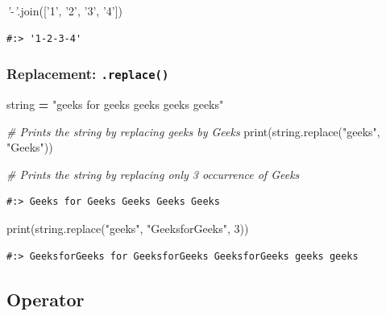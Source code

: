 \documentclass[
]{book}
\newenvironment{Shaded}{\begin{snugshade}}{\end{snugshade}}
\newcommand{\BuiltInTok}[1]{#1}
\newcommand{\CommentTok}[1]{\textcolor[rgb]{0.37,0.37,0.37}{\textit{#1}}}
\newcommand{\DecValTok}[1]{\textcolor[rgb]{0.06,0.06,0.06}{#1}}
\newcommand{\NormalTok}[1]{#1}
\newcommand{\OperatorTok}[1]{\textcolor[rgb]{0.43,0.43,0.43}{\textbf{#1}}}
\newcommand{\StringTok}[1]{\textcolor[rgb]{0.5,0.5,0.5}{#1}}
\begin{document}
\begin{Shaded}
\begin{Highlighting}[]
\CommentTok{'-'}\NormalTok{.join([}\StringTok{'1'}\NormalTok{, }\StringTok{'2'}\NormalTok{, }\StringTok{'3'}\NormalTok{, }\StringTok{'4'}\NormalTok{])}
\end{Highlighting}
\end{Shaded}

\begin{verbatim}
#:> '1-2-3-4'
\end{verbatim}

\hypertarget{replacement-.replace}{%
\subsubsection{\texorpdfstring{Replacement: \texttt{.replace()}}{Replacement: .replace()}}\label{replacement-.replace}}

\begin{Shaded}
\begin{Highlighting}[]
\NormalTok{string }\OperatorTok{=} \StringTok{"geeks for geeks geeks geeks geeks"} 
   
\CommentTok{# Prints the string by replacing geeks by Geeks  }
\BuiltInTok{print}\NormalTok{(string.replace(}\StringTok{"geeks"}\NormalTok{, }\StringTok{"Geeks"}\NormalTok{))  }
  
\CommentTok{# Prints the string by replacing only 3 occurrence of Geeks   }
\end{Highlighting}
\end{Shaded}

\begin{verbatim}
#:> Geeks for Geeks Geeks Geeks Geeks
\end{verbatim}

\begin{Shaded}
\begin{Highlighting}[]
\BuiltInTok{print}\NormalTok{(string.replace(}\StringTok{"geeks"}\NormalTok{, }\StringTok{"GeeksforGeeks"}\NormalTok{, }\DecValTok{3}\NormalTok{)) }
\end{Highlighting}
\end{Shaded}

\begin{verbatim}
#:> GeeksforGeeks for GeeksforGeeks GeeksforGeeks geeks geeks
\end{verbatim}

\hypertarget{operator}{%
\subsection{Operator}\label{operator}}
\end{document}
